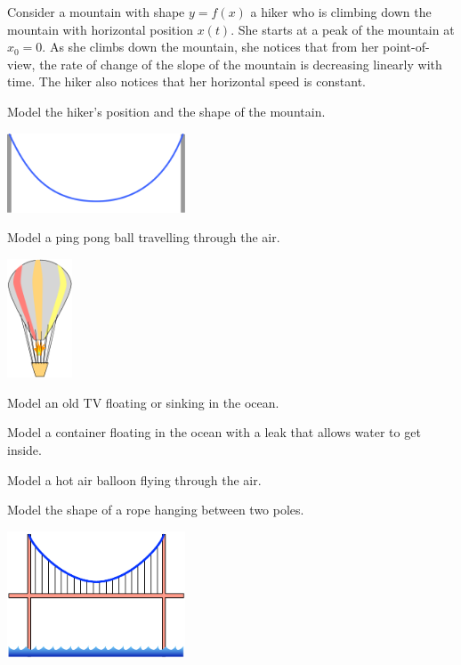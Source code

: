 \newpage

\begin{exercises}

	\begin{problist}
	
	\prob Consider a mountain with shape $y=f(x)$ a hiker who is climbing down the mountain with horizontal position $x(t)$. She starts at a peak of the mountain at $x_0=0$. As she climbs down the mountain, she notices that from her point-of-view, the rate of change of the slope of the mountain is decreasing linearly with time.
		The hiker also notices that her horizontal speed is constant.
	
		Model the hiker's position and the shape of the mountain.
	
	\prob 
	
	\begin{center}
		\includegraphics*[width=150pt]{images/module20-catenary.pdf}
	\end{center}

	\prob Model a ping pong ball travelling through the air.
	
	\begin{center}
		\includegraphics*[height=100pt]{images/module20-hotairballoon.pdf}
	\end{center}
	
	\prob Model an old TV floating or sinking in the ocean.
	
	\prob Model a container floating in the ocean with a leak that allows water to get inside.
	
	\prob Model a hot air balloon flying through the air.
	
	\prob Model the shape of a rope hanging between two poles.

	\begin{center}
		\includegraphics*[width=150pt]{images/module20-suspensionbridge.pdf}
	\end{center}


\end{problist}
\end{exercises}
